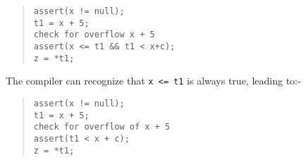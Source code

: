 \begin{quote}
\begin{verbatim}
assert(x != null);
t1 = x + 5;
check for overflow x + 5
assert(x <= t1 && t1 < x+c);
z = *t1;
\end{verbatim}
\end{quote}

The compiler can recognize that \texttt{x <= t1} is always true,
leading to:-

\begin{quote}
\begin{verbatim}
assert(x != null);
t1 = x + 5;
check for overflow of x + 5
assert(t1 < x + c);
z = *t1;
\end{verbatim}
\end{quote}
